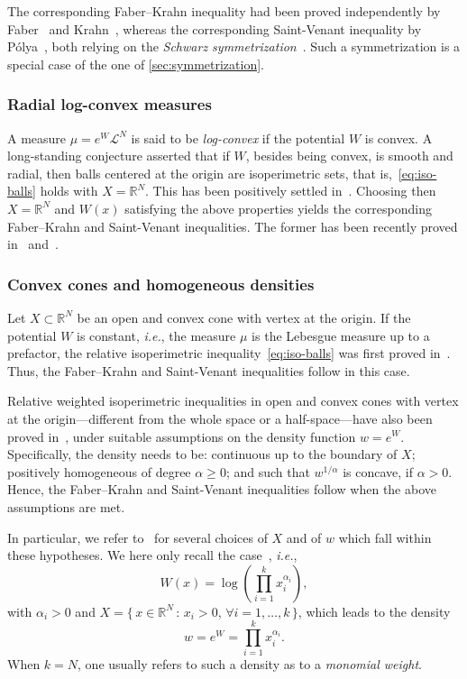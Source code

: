 \documentclass[a4paper,12pt,reqno]{amsart}
\numberwithin{equation}{section}
\theoremstyle{plain}
\theoremstyle{definition}
\begin{document}
The corresponding Faber--Krahn inequality had been proved independently by Faber~\cite{Fab23} and Krahn~\cite{Kra25}, whereas the corresponding Saint-Venant inequality by P\'olya~\cite{Pol48}, both relying on the \emph{Schwarz symmetrization}~\cite{HL30,Sch90book}. Such a symmetrization is a special case of the one of \cref{sec:symmetrization}.


\subsubsection{Radial log-convex measures}

A measure $\mu = e^W\mathcal{L}^N$ is said to be \emph{log-convex} if the potential $W$ is convex. A long-standing conjecture asserted that if $W$, besides being convex, is smooth and radial, then balls centered at the origin are isoperimetric sets, that is,~\eqref{eq:iso-balls} holds with $X=\mathbb{R}^N$. This has been positively settled in~\cite{Cha19}. Choosing then $X=\mathbb{R}^N$ and $W(x)$ satisfying the above properties yields the corresponding Faber--Krahn and Saint-Venant inequalities. The former has been recently proved in~\cite[Thm.~1.1]{CM25} and~\cite[Sect.~7.1]{NV25}.

\subsubsection{Convex cones and homogeneous densities}
\label{sec:CROS}

Let $X\subset \mathbb{R}^N$ be an open and convex cone with vertex at the origin. If the potential $W$ is constant, \emph{i.e.}, the measure $\mu$ is the Lebesgue measure up to a prefactor, the relative isoperimetric inequality~\eqref{eq:iso-balls} was first proved in~\cite{LP90}. Thus, the Faber--Krahn and Saint-Venant inequalities follow in this case. 

Relative weighted isoperimetric inequalities in open and convex cones with vertex at the origin---different from the whole space or a half-space---have also been proved in~\cite[Thm.~1.3]{CROS16}, under suitable assumptions on the density function $w=e^{W}$. Specifically, the density needs to be: continuous up to the boundary of $X$; positively homogeneous of degree $\alpha\ge 0$; and such that $w^{1/\alpha}$ is concave, if $\alpha>0$. Hence, the Faber--Krahn and Saint-Venant inequalities follow when the above assumptions are met.

In particular, we refer to~\cite[Sect.~2]{CROS16} for several choices of $X$ and of $w$ which fall within these hypotheses. We here only recall the case~\cite[Sect.~2(iv)]{CROS16}, \emph{i.e.}, 
%
\[
W(x) = \log\left(\prod_{i=1}^k x_i^{\alpha_i}\right),
\]
%
with $\alpha_i > 0$ and $X=\{\,x\in\mathbb{R}^N\,:\, x_i>0,\, \forall i=1,\dots,k\,\}$, which leads to the density
%
\[
w = e^W = \prod_{i=1}^k x_i^{\alpha_i}.
\]
%
When $k=N$, one usually refers to such a density as to a \emph{monomial weight}.
\end{document}
